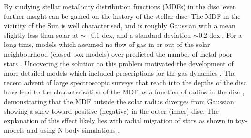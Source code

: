 By studying stellar metallicity distribution functions (MDFs) in the disc, even further insight can be gained on the history of the stellar disc. The MDF in the vicinity of the Sun is well characterised, and is roughly Gaussian with a mean \feh{} slightly less than solar at $\sim -0.1$ dex, and a standard deviation $\sim 0.2$ dex  \citep{1962AJ.....67..486V,2004A&A...418..989N,2011A&A...530A.138C,2012ApJ...761..160S}. For a long time, models which assumed no flow of gas in or out of the solar neighbourhood (closed-box models) over-predicted the number of metal poor stars \citep[the G-dwarf problem, e.g.][]{1963ApJ...137..758S,1975MNRAS.172...13P}. Uncovering the solution to this problem motivated the development of more detailed models which included prescriptions for the gas dynamics \citep[e.g.][]{1972Natur.236...21L,1976MNRAS.176...31L,1977ApJ...216..548T,1980FCPh....5..287T,1989MNRAS.239..885M}. The recent advent of large spectroscopic surveys that reach into the depths of the disc have lead to the characterisation of the MDF as a function of radius in the disc \citep[e.g.][]{2014A&A...564A.115A,2015ApJ...808..132H}, demonstrating that the MDF outside the solar radius diverges from Gaussian, showing a skew toward positive (negative) \feh{} in the outer (inner) disc. The explanation of this effect likely lies with radial migration of stars as shown in toy-models \citep{2015ApJ...808..132H} and using N-body simulations \citep{2016ApJ...818L...6L}.

